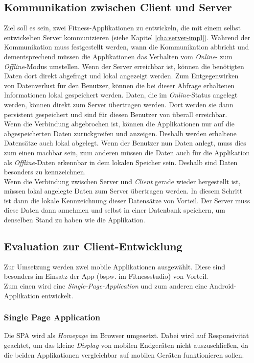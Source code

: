 \subsection{Kommunikation zwischen Client und Server}
\label{ssec:kommunikation-client-server}
Ziel soll es sein, zwei Fitness-Applikationen zu entwickeln, die mit einem selbst entwickelten Server kommunizieren (siehe Kapitel \ref{cha:server-impl}). Während der Kommunikation muss festgestellt werden, wann die Kommunikation abbricht und dementsprechend müssen die Applikationen das Verhalten vom \textit{Online}- zum \textit{Offline}-Modus umstellen. Wenn der Server erreichbar ist, können die benötigten Daten dort direkt abgefragt und lokal angezeigt werden. Zum Entgegenwirken von Datenverlust für den Benutzer, können die bei dieser Abfrage erhaltenen Informationen lokal gespeichert werden. Daten, die im \textit{Online}-Status angelegt werden, können direkt zum Server übertragen werden. Dort werden sie dann persistent gespeichert und sind für diesen Benutzer von überall erreichbar.\\
Wenn die Verbindung abgebrochen ist, können die Applikationen nur auf die abgespeicherten Daten zurückgreifen und anzeigen. Deshalb werden erhaltene Datensätze auch lokal abgelegt. Wenn der Benutzer nun Daten anlegt, muss dies zum einen machbar sein, zum anderen müssen die Daten auch für die Applikation als \textit{Offline}-Daten erkennbar in dem lokalen Speicher sein. Deshalb sind Daten besonders zu kennzeichnen.\\
Wenn die Verbindung zwischen Server und \textit{Client} gerade wieder hergestellt ist, müssen lokal angelegte Daten zum Server übertragen werden. In diesem Schritt ist dann die lokale Kennzeichnung dieser Datensätze von Vorteil. Der Server muss diese Daten dann annehmen und selbst in einer Datenbank speichern, um denselben Stand zu haben wie die Applikation.
\subsection{Evaluation zur Client-Entwicklung}
\label{ssec:evaluation-client-entwicklung}
Zur Umsetzung werden zwei mobile Applikationen ausgewählt. Diese sind besonders im Einsatz der App (bspw. im Fitnessstudio) von Vorteil. \\
Zum einen wird eine \textit{Single-Page-Application} und zum anderen eine Android-Applikation entwickelt.
\subsubsection*{Single Page Application}
\label{ssec:aufgabenstellung:spa}
Die \ac{SPA} wird als \textit{Homepage} im Browser umgesetzt. Dabei wird auf Responsivität geachtet, um das kleine \textit{Display} von mobilen Endgeräten nicht auszuschließen, da die beiden Applikationen vergleichbar auf mobilen Geräten funktionieren sollen.
